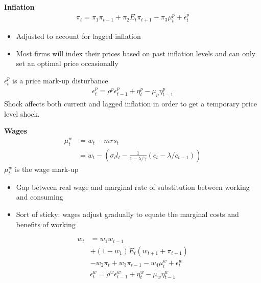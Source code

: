\documentclass{beamer}
\begin{document}
\begin{frame}
  \textbf{Inflation}
\begin{align}
  \pi_t = \pi_1\pi_{t-1} +\pi_2 E_t\pi_{t+1} - \pi_3\mu_t^p + \epsilon_t^p
\end{align}
  \begin{itemize}
   \item Adjusted to account for lagged inflation
   \item Most firms will index their prices based on past inflation levels and can only set an optimal price occasionally
 \end{itemize}
\medskip
$\epsilon_t^p$ is a price mark-up disturbance 
\begin{align}
  \epsilon_t^p = \rho^p \epsilon^p_{t-1} + \eta_t^p - \mu_p\eta_{t-1}^p
\end{align}
\medskip
Shock affects both current and lagged inflation in order to get a temporary price level shock. 
\end{frame}

\begin{frame}
 \textbf{Wages}  
  \begin{align}
  \mu_t^w &= w_t - mrs_t\\
  &= w_t - \left( \sigma_l l_t - \frac{1}{1-\lambda/\gamma} (c_t - \lambda/ c_{t-1}) \right)  
\end{align}
 \medskip
$\mu_t^w$ is the wage mark-up 
\begin{itemize}
  \item Gap between real wage and marginal rate of substitution between working and consuming
  \item Sort of sticky: wages adjust gradually to equate the marginal costs and benefits of working
\end{itemize}
\end{frame}

\begin{frame}
\begin{align}
  w_t &= w_1w_{t-1} \\ \nonumber &+ (1-w_1)E_t(w_{t+1} + \pi_{t+1}) \\ \nonumber
  &- w_2\pi_t + w_3\pi_{t-1} - w_4\mu_t^w + \epsilon_t^w   
\end{align}
\begin{align}
  \epsilon_t^w = \rho^w \epsilon^w_{t-1} + \eta_t^w - \mu_w \eta_{t-1}^w
\end{align} 
\end{frame}
\end{document}
